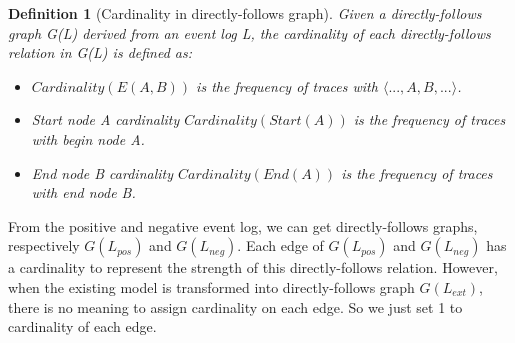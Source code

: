 \documentclass[]{article}
\newtheorem{mydef}{Definition}[section]
\begin{document}
\begin{mydef}[Cardinality in directly-follows graph]
	Given a directly-follows graph G(L) derived from an event log L, the cardinality of each directly-follows relation in G(L) is defined as:  
	\begin{itemize}
		\item $Cardinality(E(A,B))$ is the frequency of traces with $\langle ...,A,B,... \rangle$. 
		\item Start node A cardinality $Cardinality(Start(A))$ is the frequency of traces with begin node A.
		\item End node B cardinality $Cardinality(End(A))$ is the frequency of traces with end node B.
	\end{itemize}	
\end{mydef}
From the positive and negative event log, we can get directly-follows graphs, respectively $G(L_{pos})$ and $G(L_{neg})$. Each edge of  $G(L_{pos})$ and $G(L_{neg})$ has a cardinality to represent the strength of this directly-follows relation. 
However, when the existing model is transformed into  directly-follows graph $G(L_{ext})$, there is no meaning to assign cardinality on each edge. So we just set 1 to cardinality of each edge. 
\end{document}
